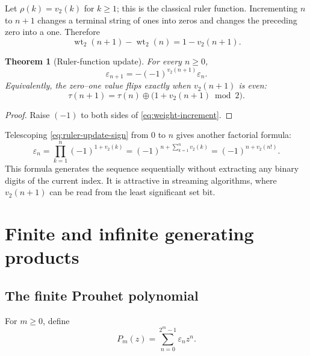 \documentclass[11pt,oneside]{article}
\newtheorem{theorem}{Theorem}[section]
\theoremstyle{definition}
\theoremstyle{remark}
\newcommand{\wt}{\operatorname{wt}_2}
\newcommand{\vtwo}{v_2}
\newcommand{\xor}{\mathbin{\oplus}}
\begin{document}
Let \(\rho(k)=\vtwo(k)\) for \(k\ge1\); this is the classical ruler function.
Incrementing \(n\) to \(n+1\) changes a terminal string of ones into zeros and
changes the preceding zero into a one.  Therefore
\begin{equation}
 \wt(n+1)-\wt(n)=1-\vtwo(n+1).
 \label{eq:weight-increment}
\end{equation}

\begin{theorem}[Ruler-function update]
\label{thm:ruler-update}
For every \(n\ge0\),
\begin{equation}
 \varepsilon_{n+1}
 =-(-1)^{\vtwo(n+1)}\varepsilon_n.
 \label{eq:ruler-update-sign}
\end{equation}
Equivalently, the zero--one value flips exactly when \(\vtwo(n+1)\) is even:
\begin{equation}
 \tau(n+1)=\tau(n)\xor
       \bigl(1+\vtwo(n+1)\bmod2\bigr).
 \label{eq:ruler-update-bit}
\end{equation}
\end{theorem}

\begin{proof}
Raise \((-1)\) to both sides of \eqref{eq:weight-increment}.
\end{proof}

Telescoping \eqref{eq:ruler-update-sign} from \(0\) to \(n\) gives another
factorial formula:
\begin{equation}
 \varepsilon_n
 =\prod_{k=1}^n(-1)^{1+\vtwo(k)}
 =(-1)^{n+\sum_{k=1}^n\vtwo(k)}
 =(-1)^{n+\vtwo(n!)}.
 \label{eq:ruler-product}
\end{equation}
This formula generates the sequence sequentially without extracting any
binary digits of the current index.  It is attractive in streaming
algorithms, where \(\vtwo(n+1)\) can be read from the least significant set
bit.

\section{Finite and infinite generating products}
\label{sec:generating}

\subsection{The finite Prouhet polynomial}

For \(m\ge0\), define
\begin{equation}
 P_m(z)=\sum_{n=0}^{2^m-1}\varepsilon_nz^n.
 \label{eq:P-def}
\end{equation}
\end{document}

